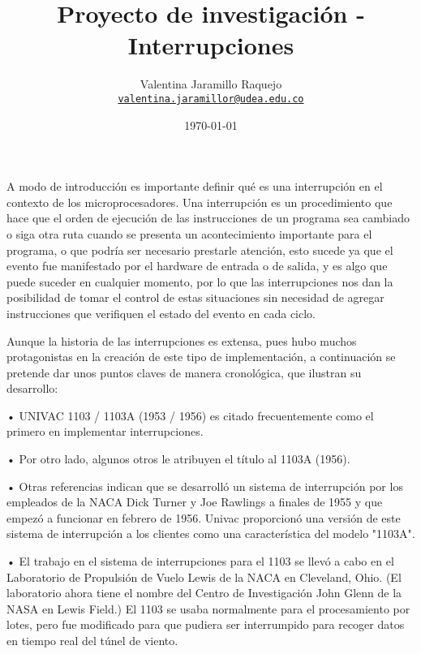\documentclass[12pt]{article}
\title{Proyecto de investigación - Interrupciones
}
\author{Valentina Jaramillo Raquejo\\%
    \href{mailto:valentina.jaramillor@udea.edu.co}{\texttt{valentina.jaramillor@udea.edu.co}} %
    }
\date{\today}
\begin{document}
{
\maketitle



A modo de introducción es importante definir qué es una interrupción en el contexto de los microprocesadores. Una interrupción es un procedimiento que hace que el orden de ejecución de las instrucciones de un programa sea cambiado o siga otra ruta cuando se presenta un acontecimiento importante para el programa, o que podría ser necesario prestarle atención, esto sucede ya que el evento fue manifestado por el hardware de entrada o de salida, y es algo que puede suceder en cualquier momento, por lo que las interrupciones nos dan la posibilidad de tomar el control de estas situaciones sin necesidad de agregar instrucciones que verifiquen el estado del evento en cada ciclo.\citep{LambdaEcu}
\newline

Aunque la historia de las interrupciones es extensa, pues hubo muchos protagonistas en la creación de este tipo de implementación, a continuación se pretende dar unos puntos claves de manera cronológica, que ilustran su desarrollo:


•	UNIVAC 1103 / 1103A (1953 / 1956)  es citado frecuentemente como el primero en implementar interrupciones.

•	Por otro lado, algunos otros le atribuyen el título al 1103A (1956).

•	Otras referencias indican que se desarrolló un sistema de interrupción por los empleados de la NACA Dick Turner y Joe Rawlings a finales de 1955 y que empezó a funcionar en febrero de 1956. Univac proporcionó una versión de este sistema de interrupción a los clientes como una característica del modelo "1103A".

•	El trabajo en el sistema de interrupciones para el 1103 se llevó a cabo en el Laboratorio de Propulsión de Vuelo Lewis de la NACA en Cleveland, Ohio. (El laboratorio ahora tiene el nombre del Centro de Investigación John Glenn de la NASA en Lewis Field.) El 1103 se usaba normalmente para el procesamiento por lotes, pero fue modificado para que pudiera ser interrumpido para recoger datos en tiempo real del túnel de viento.

}
\end{document}

